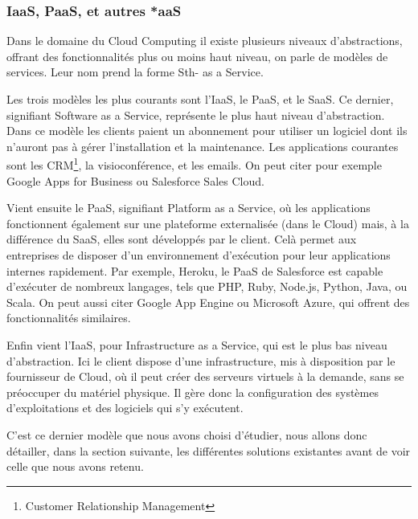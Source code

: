 \documentclass[a4paper,oneside]{report}
\begin{document}
\subsubsection{IaaS, PaaS, et autres *aaS}
Dans le domaine du Cloud Computing il existe plusieurs niveaux d’abstractions, offrant des fonctionnalités plus ou moins haut niveau, on parle de modèles de services.
Leur nom prend la forme Sth- as a Service.

Les trois modèles les plus courants sont l'IaaS, le PaaS, et le SaaS.
Ce dernier, signifiant Software as a Service, représente le plus haut niveau d'abstraction.\newline
Dans ce modèle les clients paient un abonnement pour utiliser un logiciel dont ils n'auront pas à gérer l'installation et la maintenance.
Les applications courantes sont les CRM\footnote{Customer Relationship Management}, la visioconférence, et les emails.
On peut citer pour exemple Google Apps for Business ou Salesforce Sales Cloud.

Vient ensuite le PaaS, signifiant Platform as a Service, où les applications fonctionnent également sur une plateforme externalisée (dans le Cloud) mais, à la différence du SaaS, elles sont développés par le client.\newline
Celà permet aux entreprises de disposer d'un environnement d'exécution pour leur applications internes rapidement.
Par exemple, Heroku, le PaaS de Salesforce est capable d'exécuter de nombreux langages, tels que PHP, Ruby, Node.js, Python, Java, ou Scala.
On peut aussi citer Google App Engine ou Microsoft Azure, qui offrent des fonctionnalités similaires.

Enfin vient l'IaaS, pour Infrastructure as a Service, qui est le plus bas niveau d'abstraction. 
Ici le client dispose d'une infrastructure, mis à disposition par le fournisseur de Cloud, où il peut créer des serveurs virtuels à la demande, sans se préoccuper du matériel physique.
Il gère donc la configuration des systèmes d'exploitations et des logiciels qui s'y exécutent.

C'est ce dernier modèle que nous avons choisi d'étudier, nous allons donc détailler, dans la section suivante, les différentes solutions existantes avant de voir celle que nous avons retenu.
\end{document}
